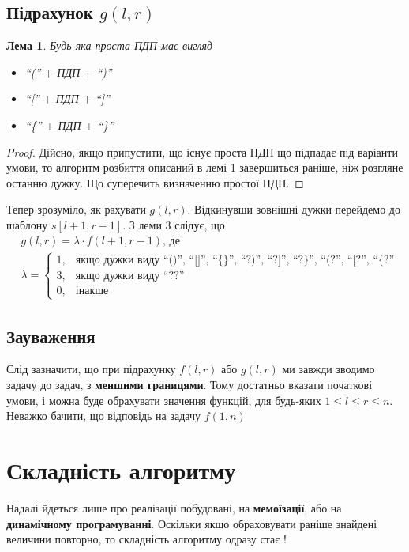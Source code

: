 \documentclass[
  11pt,
  a4paper
]{extarticle}
\newtheorem{lemma}{Лема}
\theoremstyle{definition}
\theoremstyle{remark}
\begin{document}
    \subsection{Підрахунок $g(l, r)$}
      \begin{lemma}
        Будь-яка проста ПДП має вигляд
        \begin{itemize}
          \item{``('' $+$ ПДП $+$ ``)''}
          \item{``['' $+$ ПДП $+$ ``]''}
          \item{``\{'' $+$ ПДП $+$ ``\}''}
        \end{itemize}
      \end{lemma}
      \begin{proof}
        Дійсно, якщо припустити, що існує проста ПДП що підпадає під варіанти  умови, то алгоритм розбиття описаний в лемі 1 завершиться раніше, ніж розгляне останню дужку. Що суперечить визначенню простої ПДП.
      \end{proof}
      Тепер зрозуміло, як рахувати $g(l, r)$. Відкинувши зовнішні дужки перейдемо до шаблону $s[l + 1, r - 1]$. З леми 3 слідує, що
      \begin{align*}
        &g(l, r) = \lambda \cdot f(l + 1, r - 1) \text{, де} \\
        &\lambda = 
        \begin{cases}
          1, & \text{якщо дужки виду ``()'', ``[]'', ``\{\}'', ``?)'', ``?]'', ``?\}'', ``(?'', ``[?'', ``\{?''} \\
          3, & \text{якщо дужки виду ``??''} \\
          0, & \text{інакше} 
        \end{cases}
      \end{align*}
    \subsection{Зауваження}
      Слід зазначити, що при підрахунку $f(l, r)$ або $g(l, r)$ ми завжди зводимо задачу до задач, з \textbf{меншими границями}. Тому достатньо вказати початкові умови, і можна буде обрахувати значення функцій, для будь-яких $1 \leq l \leq r \leq n$. Неважко бачити, що відповідь на задачу $f(1, n)$
  \section{Складність алгоритму}
  Надалі йдеться лише про реалізації побудовані, на \textbf{мемоїзації}, або на \textbf{динамічному програмуванні}. Оскільки якщо обраховувати раніше знайдені величини повторно, то складність алгоритму одразу стає \textbf{}!
\end{document}

